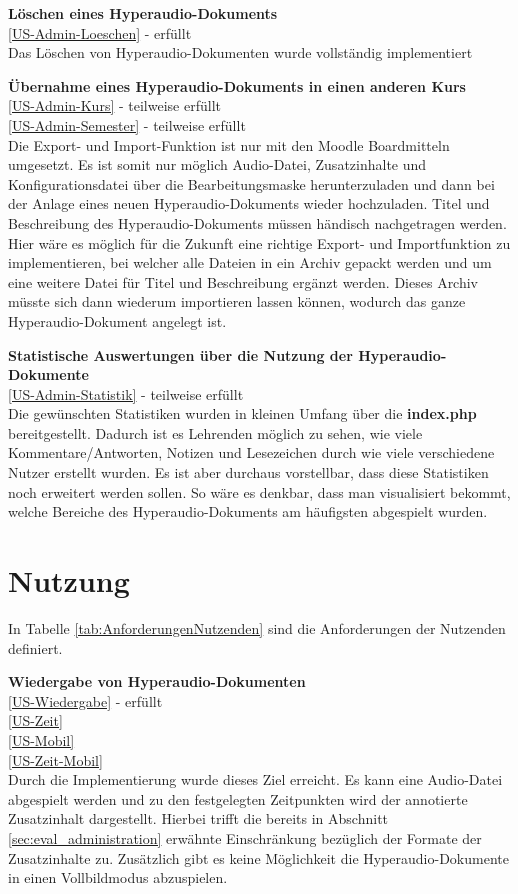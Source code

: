\textbf{Löschen eines Hyperaudio-Dokuments}\\
\ref{US-Admin-Loeschen} - erfüllt\\
Das Löschen von Hyperaudio-Dokumenten wurde vollständig implementiert

\textbf{Übernahme eines Hyperaudio-Dokuments in einen anderen Kurs}\\
\ref{US-Admin-Kurs} - teilweise erfüllt\\
\ref{US-Admin-Semester} - teilweise erfüllt\\
Die Export- und Import-Funktion ist nur mit den Moodle Boardmitteln umgesetzt. Es ist somit nur möglich Audio-Datei, Zusatzinhalte und Konfigurationsdatei über die Bearbeitungsmaske herunterzuladen und dann bei der Anlage eines neuen Hyperaudio-Dokuments wieder hochzuladen. Titel und Beschreibung des Hyperaudio-Dokuments müssen händisch nachgetragen werden. Hier wäre es möglich für die Zukunft eine richtige Export- und Importfunktion zu implementieren, bei welcher alle Dateien in ein Archiv gepackt werden und um eine weitere Datei für Titel und Beschreibung ergänzt werden. Dieses Archiv müsste sich dann wiederum importieren lassen können, wodurch das ganze Hyperaudio-Dokument angelegt ist.

\textbf{Statistische Auswertungen über die Nutzung der Hyperaudio-Dokumente}\\
\ref{US-Admin-Statistik} - teilweise erfüllt\\
Die gewünschten Statistiken wurden in kleinen Umfang über die \textbf{index.php} bereitgestellt. Dadurch ist es Lehrenden möglich zu sehen, wie viele Kommentare/Antworten, Notizen und Lesezeichen durch wie viele verschiedene Nutzer erstellt wurden. Es ist aber durchaus vorstellbar, dass diese Statistiken noch erweitert werden sollen. So wäre es denkbar, dass man visualisiert bekommt, welche Bereiche des Hyperaudio-Dokuments am häufigsten abgespielt wurden.

 
\section{Nutzung}
In Tabelle \ref{tab:AnforderungenNutzenden} sind die Anforderungen der Nutzenden definiert.

\textbf{Wiedergabe von Hyperaudio-Dokumenten}\\
\ref{US-Wiedergabe} - erfüllt\\
\ref{US-Zeit}\\
\ref{US-Mobil}\\
\ref{US-Zeit-Mobil}\\
Durch die Implementierung wurde dieses Ziel erreicht. Es kann eine Audio-Datei abgespielt werden und zu den festgelegten Zeitpunkten wird der annotierte Zusatzinhalt dargestellt. Hierbei trifft die bereits in Abschnitt \ref{sec:eval_administration} erwähnte Einschränkung bezüglich der Formate der Zusatzinhalte zu. Zusätzlich gibt es keine Möglichkeit die Hyperaudio-Dokumente in einen Vollbildmodus abzuspielen.

